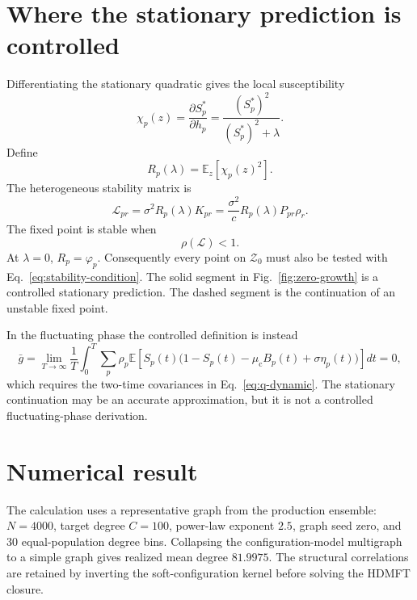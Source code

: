 \documentclass[11pt]{article}
\newcommand{\E}{\mathbb E}
\newcommand{\mc}{\mu_{\mathrm c}}
\begin{document}
\section{Where the stationary prediction is controlled}

Differentiating the stationary quadratic gives the local susceptibility
\begin{equation}
  \chi_p(z)=\frac{\partial S_p^*}{\partial h_p}
  =\frac{(S_p^*)^2}{(S_p^*)^2+\lambda}.
\end{equation}
Define
\begin{equation}
  R_p(\lambda)=\E_z[\chi_p(z)^2].
\end{equation}
The heterogeneous stability matrix is
\begin{equation}
  \mathcal L_{pr}
  =\sigma^2R_p(\lambda)K_{pr}
  =\frac{\sigma^2}{c}R_p(\lambda)P_{pr}\rho_r.
  \label{eq:stability-matrix}
\end{equation}
The fixed point is stable when
\begin{equation}
  \rho(\mathcal L)<1.
  \label{eq:stability-condition}
\end{equation}
At $\lambda=0$, $R_p=\varphi_p$.  Consequently every point on
$\mathcal Z_0$ must also be tested with Eq.~\eqref{eq:stability-condition}.
The solid segment in Fig.~\ref{fig:zero-growth} is a controlled stationary
prediction.  The dashed segment is the continuation of an unstable fixed
point.

In the fluctuating phase the controlled definition is instead
\begin{equation}
  \bar g=\lim_{T\to\infty}\frac1T\int_0^T
  \sum_p\rho_p\E\!\left[S_p(t)
  \bigl(1-S_p(t)-\mc B_p(t)+\sigma\eta_p(t)\bigr)\right]dt=0,
  \label{eq:dynamic-zero}
\end{equation}
which requires the two-time covariances in Eq.~\eqref{eq:q-dynamic}.  The
stationary continuation may be an accurate approximation, but it is not a
controlled fluctuating-phase derivation.

\section{Numerical result}

The calculation uses a representative graph from the production ensemble:
$N=4000$, target degree $C=100$, power-law exponent $2.5$, graph seed zero,
and 30 equal-population degree bins.  Collapsing the configuration-model
multigraph to a simple graph gives realized mean degree $81.9975$.  The
structural correlations are retained by inverting the soft-configuration
kernel before solving the HDMFT closure.
\end{document}
